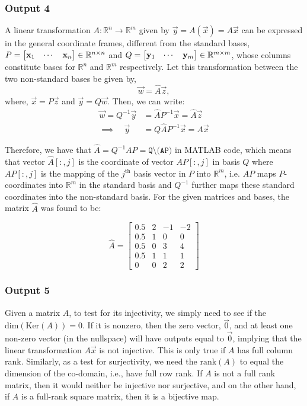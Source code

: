 \documentclass[10pt]{article}
\begin{document}
\subsubsection{Output 4}
A linear transformation $A : \mathbb{R}^n \rightarrow \mathbb{R}^m$ given by $\vec{y} = A(\vec{x}) = A\vec{x}$ can be expressed in the general coordinate frames, different from the standard bases, $P = \begin{bmatrix} \mathbf{x}_1 & \cdots & \mathbf{x}_n \end{bmatrix} \in \mathbb{R}^{n\times n}$ and $Q = \begin{bmatrix} \mathbf{y}_1 & \cdots & \mathbf{y}_m \end{bmatrix} \in \mathbb{R}^{m\times m}$, whose columns constitute bases for $\mathbb{R}^n$ and $\mathbb{R}^m$ respectively. Let this transformation between the two non-standard bases be given by,
\[
    \vec{w}=\hat{A}\vec{z},
\]
where, $\vec{x}=P\vec{z}$ and $\vec{y} = Q\vec{w}$. Then, we can write:
\begin{align*}
    \vec{w} = Q^{-1}\vec{y} &= \hat{A}P^{-1}\vec{x} = \hat{A}\vec{z}\\
    \implies \quad \vec{y} &= Q\hat{A}P^{-1}\vec{x} = A\vec{x}
\end{align*}

Therefore, we have that $\hat{A} = Q^{-1}AP=\texttt{Q\textbackslash (AP)}$ in \textsc{MATLAB} code, which means that vector ${\hat{A}}[:, j]$ is the coordinate of vector $AP[:, j]$ in basis $Q$ where $AP[:, j]$ is the mapping of the $j^{\text{th}}$ basis vector in $P$ into $\mathbb{R}^m$, i.e. $AP$ maps $P$-coordinates into $\mathbb{R}^m$ in the standard basis and $Q^{-1}$ further maps these standard coordinates into the non-standard basis. For the given matrices and bases, the matrix $\hat{A}$ was found to be:

\[
\hat{A} = 
\begin{bmatrix}
    0.5  &   2  & -1  & -2\\
    0.5  &   1  &  0  & 0\\
    0.5  &   0  &  3  & 4\\
    0.5  &   1  &  1  & 1\\
    0    &   0  &  2  & 2
\end{bmatrix}
\]

\subsubsection{Output 5}
Given a matrix $A$, to test for its injectivity, we simply need to see if the $\text{dim}(\text{Ker}(A)) = 0$. If it is nonzero, then the zero vector, $\vec{0}$, and at least one non-zero vector (in the nullspace) will have outputs equal to $\vec{0}$, implying that the linear transformation $A\vec{x}$ is not injective. This is only true if $A$ has full column rank. Similarly, as a test for surjectivity, we need the $\text{rank}(A)$ to equal the dimension of the co-domain, i.e., have full row rank. If $A$ is not a full rank matrix, then it would neither be injective nor surjective, and on the other hand, if $A$ is a full-rank square matrix, then it is a bijective map.
\end{document}

